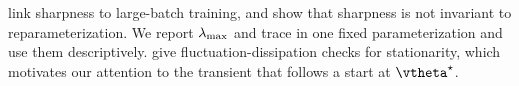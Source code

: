 \citet{keskar2017large} link sharpness to large-batch training, and \citet{dinh2017sharp} show that sharpness is not invariant to reparameterization.
We report $\lambda_{\max}$ and trace in one fixed parameterization and use them descriptively.
\citet{yaida2019fluctuation} give fluctuation-dissipation checks for stationarity, which motivates our attention to the transient that follows a start at $\tstar$.
